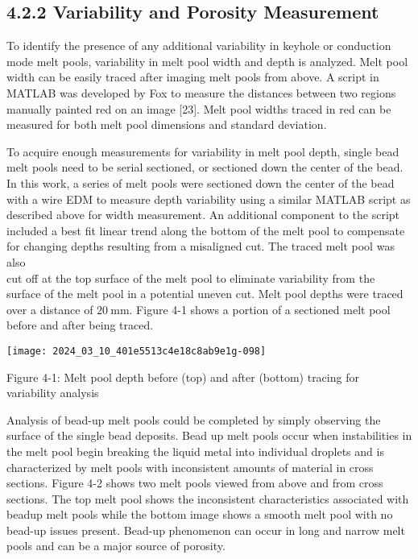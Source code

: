 \documentclass[10pt]{article}
\begin{document}
\subsection*{4.2.2 Variability and Porosity Measurement}
To identify the presence of any additional variability in keyhole or conduction mode melt pools, variability in melt pool width and depth is analyzed. Melt pool width can be easily traced after imaging melt pools from above. A script in MATLAB was developed by Fox to measure the distances between two regions manually painted red on an image [23]. Melt pool widths traced in red can be measured for both melt pool dimensions and standard deviation.

To acquire enough measurements for variability in melt pool depth, single bead melt pools need to be serial sectioned, or sectioned down the center of the bead. In this work, a series of melt pools were sectioned down the center of the bead with a wire EDM to measure depth variability using a similar MATLAB script as described above for width measurement. An additional component to the script included a best fit linear trend along the bottom of the melt pool to compensate for changing depths resulting from a misaligned cut. The traced melt pool was also\\
cut off at the top surface of the melt pool to eliminate variability from the surface of the melt pool in a potential uneven cut. Melt pool depths were traced over a distance of $20 \mathrm{~mm}$. Figure 4-1 shows a portion of a sectioned melt pool before and after being traced.

\begin{center}
\texttt{[image: 2024\_03\_10\_401e5513c4e18c8ab9e1g-098]}
\end{center}

Figure 4-1: Melt pool depth before (top) and after (bottom) tracing for variability analysis

Analysis of bead-up melt pools could be completed by simply observing the surface of the single bead deposits. Bead up melt pools occur when instabilities in the melt pool begin breaking the liquid metal into individual droplets and is characterized by melt pools with inconsistent amounts of material in cross sections. Figure 4-2 shows two melt pools viewed from above and from cross sections. The top melt pool shows the inconsistent characteristics associated with beadup melt pools while the bottom image shows a smooth melt pool with no bead-up issues present. Bead-up phenomenon can occur in long and narrow melt pools and can be a major source of porosity.
\end{document}
